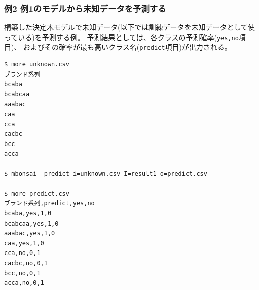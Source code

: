 \subsubsection{例2 例1のモデルから未知データを予測する}
構築した決定木モデルで未知データ(以下では訓練データを未知データとして使っている)を予測する例。
予測結果としては、各クラスの予測確率(\verb|yes,no|項目)、
およびその確率が最も高いクラス名(\verb|predict|項目)が出力される。
\begin{Verbatim}[baselinestretch=0.7,frame=single]
$ more unknown.csv
ブランド系列
bcaba
bcabcaa
aaabac
caa
cca
cacbc
bcc
acca

$ mbonsai -predict i=unknown.csv I=result1 o=predict.csv

$ more predict.csv
ブランド系列,predict,yes,no
bcaba,yes,1,0
bcabcaa,yes,1,0
aaabac,yes,1,0
caa,yes,1,0
cca,no,0,1
cacbc,no,0,1
bcc,no,0,1
acca,no,0,1
\end{Verbatim}

